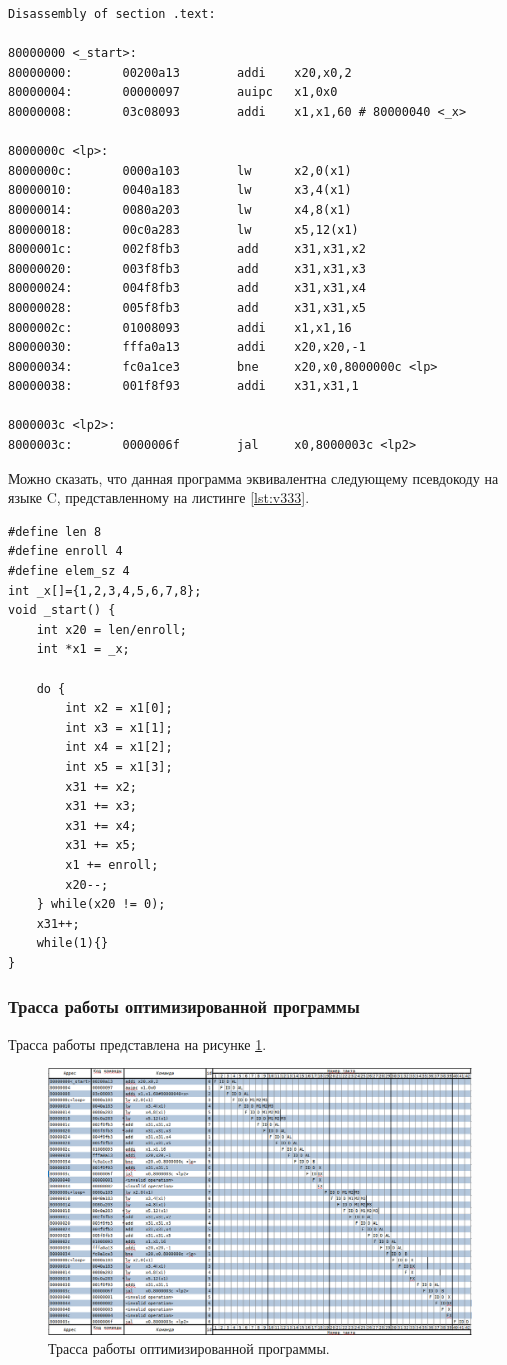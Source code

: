 \begin{lstlisting}[label=lst:v222,caption=Дизассемблированный код 9 варинта (оптимизированный)]
Disassembly of section .text:

80000000 <_start>:
80000000:       00200a13        addi    x20,x0,2
80000004:       00000097        auipc   x1,0x0
80000008:       03c08093        addi    x1,x1,60 # 80000040 <_x>

8000000c <lp>:
8000000c:       0000a103        lw      x2,0(x1)
80000010:       0040a183        lw      x3,4(x1)
80000014:       0080a203        lw      x4,8(x1)
80000018:       00c0a283        lw      x5,12(x1)
8000001c:       002f8fb3        add     x31,x31,x2
80000020:       003f8fb3        add     x31,x31,x3
80000024:       004f8fb3        add     x31,x31,x4
80000028:       005f8fb3        add     x31,x31,x5
8000002c:       01008093        addi    x1,x1,16
80000030:       fffa0a13        addi    x20,x20,-1
80000034:       fc0a1ce3        bne     x20,x0,8000000c <lp>
80000038:       001f8f93        addi    x31,x31,1

8000003c <lp2>:
8000003c:       0000006f        jal     x0,8000003c <lp2>
\end{lstlisting}
\clearpage

Можно сказать, что данная программа эквивалентна следующему псевдокоду на языке C, представленному на листинге \ref{lst:v333}.

\begin{lstlisting}[label=lst:v333,caption=Псевдокод программы 9 варинта (оптимизированный)]
#define len 8
#define enroll 4
#define elem_sz 4
int _x[]={1,2,3,4,5,6,7,8};
void _start() {
	int x20 = len/enroll;
	int *x1 = _x;
	
	do {
		int x2 = x1[0];
		int x3 = x1[1];
		int x4 = x1[2];
		int x5 = x1[3];
		x31 += x2;
		x31 += x3;
		x31 += x4;
		x31 += x5;
		x1 += enroll;
		x20--;
	} while(x20 != 0);
	x31++;
	while(1){}
}
\end{lstlisting}

\clearpage

\subsubsection*{Трасса работы оптимизированной программы}
Трасса работы представлена на рисунке \ref{img:t5-trasa-02}.

\begin{figure}[h]
	\centering
	\includegraphics[height=0.4\textheight]{img/t5-trasa-02}
	\caption{Трасса работы оптимизированной программы.}
	\label{img:t5-trasa-02}
\end{figure}

